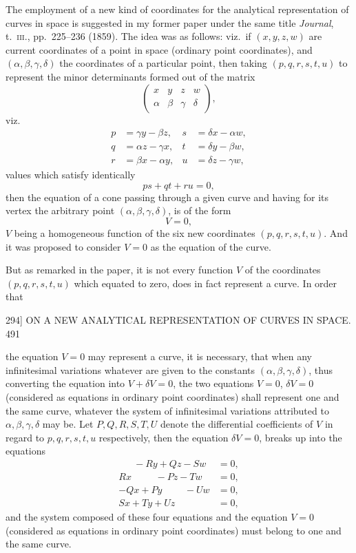 \documentclass[11pt]{article}
\begin{document}
\medskip

The employment of a new kind of coordinates for the analytical representation
of curves in space is suggested in my former paper under the same title \textit{Journal},
t.\ \textsc{iii}., pp.\ 225--236 (1859). The idea was as follows: viz.\ if $(x,y,z,w)$ are current
coordinates of a point in space (ordinary point coordinates), and $(\alpha,\beta,\gamma,\delta)$ the
coordinates of a particular point, then taking $(p,q,r,s,t,u)$ to represent the minor
determinants formed out of the matrix
\[ \begin{pmatrix} x & y & z & w \\ \alpha & \beta & \gamma & \delta \end{pmatrix}, \]
viz.
\[ \begin{aligned}
p &= \gamma y-\beta z, & s &= \delta x-\alpha w,\\
q &= \alpha z-\gamma x, & t &= \delta y-\beta w,\\
r &= \beta x-\alpha y, & u &= \delta z-\gamma w,
\end{aligned} \]
values which satisfy identically
\[ ps+qt+ru=0, \]
then the equation of a cone passing through a given curve and having for its vertex
the arbitrary point $(\alpha,\beta,\gamma,\delta)$, is of the form
\[ V=0, \]
$V$ being a homogeneous function of the six new coordinates $(p,q,r,s,t,u)$. And
it was proposed to consider $V=0$ as the equation of the curve.

But as remarked in the paper, it is not every function $V$ of the coordinates
$(p,q,r,s,t,u)$ which equated to zero, does in fact represent a curve. In order that

\newpage
\begin{center}
\textsc{294]} \hfill ON A NEW ANALYTICAL REPRESENTATION OF CURVES IN SPACE. \hfill 491
\end{center}

the equation $V=0$ may represent a curve, it is necessary, that when any infinitesimal
variations whatever are given to the constants $(\alpha,\beta,\gamma,\delta)$, thus converting the equation
into $V+\delta V=0$, the two equations $V=0$, $\delta V=0$ (considered as equations in ordinary
point coordinates) shall represent one and the same curve, whatever the system of
infinitesimal variations attributed to $\alpha,\beta,\gamma,\delta$ may be. Let $P,Q,R,S,T,U$ denote
the differential coefficients of $V$ in regard to $p,q,r,s,t,u$ respectively, then the
equation $\delta V=0$, breaks up into the equations
\[ \begin{aligned}
\phantom{Rx}\ -Ry+Qz-Sw &= 0,\\
Rx\ \phantom{-Ry}\ -Pz-Tw &= 0,\\
-Qx+Py\ \phantom{-Pz}\ -Uw &= 0,\\
Sx+Ty+Uz\ \phantom{-Uw} &= 0,
\end{aligned} \]
and the system composed of these four equations and the equation $V=0$ (considered
as equations in ordinary point coordinates) must belong to one and the same curve.
\end{document}
